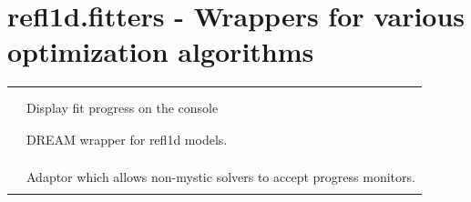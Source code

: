 \documentclass[letterpaper,10pt,english]{sphinxmanual}
\begin{document}
\section{refl1d.fitters - Wrappers for various optimization algorithms}
\label{api/fitters:refl1d-fitters-wrappers-for-various-optimization-algorithms}\label{api/fitters::doc}
\begin{tabulary}{\linewidth}{LL}
\hline

{\hyperref[api/fitters:refl1d.fitters.AmoebaFit]{}}
 & 

\\

{\hyperref[api/fitters:refl1d.fitters.BFGSFit]{}}
 & 

\\

{\hyperref[api/fitters:refl1d.fitters.ConsoleMonitor]{}}
 & 
Display fit progress on the console
\\

{\hyperref[api/fitters:refl1d.fitters.DEFit]{}}
 & 

\\

{\hyperref[api/fitters:refl1d.fitters.DreamFit]{}}
 & 

\\

{\hyperref[api/fitters:refl1d.fitters.DreamModel]{}}
 & 
DREAM wrapper for refl1d models.
\\

{\hyperref[api/fitters:refl1d.fitters.FitBase]{}}
 & 

\\

{\hyperref[api/fitters:refl1d.fitters.FitDriver]{}}
 & 

\\

{\hyperref[api/fitters:refl1d.fitters.FitOptions]{}}
 & 

\\

{\hyperref[api/fitters:refl1d.fitters.MonitorRunner]{}}
 & 
Adaptor which allows non-mystic solvers to accept progress monitors.
\\

{\hyperref[api/fitters:refl1d.fitters.MultiStart]{}}
 & 

\\


\end{tabulary}
\end{document}
